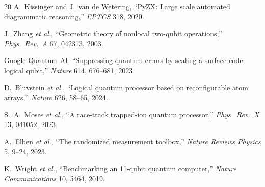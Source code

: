 \documentclass[11pt]{article}
\begin{document}
\begin{thebibliography}{20}
 A.~Kissinger and J.~van de Wetering, ``PyZX: Large scale automated diagrammatic reasoning,'' \textit{EPTCS} 318, 2020.

 J.~Zhang \textit{et al.}, ``Geometric theory of nonlocal two-qubit operations,'' \textit{Phys.\ Rev.\ A} 67, 042313, 2003.

 Google Quantum AI, ``Suppressing quantum errors by scaling a surface code logical qubit,'' \textit{Nature} 614, 676--681, 2023.

 D.~Bluvstein \textit{et al.}, ``Logical quantum processor based on reconfigurable atom arrays,'' \textit{Nature} 626, 58--65, 2024.

 S.~A.~Moses \textit{et al.}, ``A race-track trapped-ion quantum processor,'' \textit{Phys.\ Rev.\ X} 13, 041052, 2023.

 A.~Elben \textit{et al.}, ``The randomized measurement toolbox,'' \textit{Nature Reviews Physics} 5, 9--24, 2023.

 K.~Wright \textit{et al.}, ``Benchmarking an 11-qubit quantum computer,'' \textit{Nature Communications} 10, 5464, 2019.

\end{thebibliography}
\end{document}
